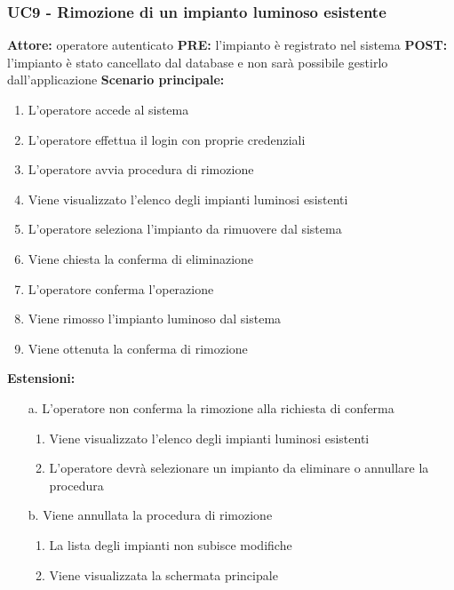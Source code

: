 \documentclass[a4paper, 12pt]{article}
\begin{document}
\subsubsection{UC9 - Rimozione di un impianto luminoso esistente}
\textbf{Attore:} operatore autenticato\newline
\textbf{PRE:} l'impianto è registrato nel sistema\newline
\textbf{POST:} l'impianto è stato cancellato dal database e non sarà possibile gestirlo dall'applicazione\newline
\textbf{Scenario principale:}
\begin{enumerate}
    \item L'operatore accede al sistema
    \item L'operatore effettua il login con proprie credenziali
    \item L'operatore avvia procedura di rimozione
    \item Viene visualizzato l'elenco degli impianti luminosi esistenti
    \item L'operatore seleziona l'impianto da rimuovere dal sistema
    \item Viene chiesta la conferma di eliminazione
    \item L'operatore conferma l'operazione
    \item Viene rimosso l'impianto luminoso dal sistema
    \item Viene ottenuta la conferma di rimozione
\end{enumerate}
\textbf{Estensioni:}
\begin{itemize}
    \item [a.] L'operatore non conferma la rimozione alla richiesta di conferma
    \begin{enumerate}
        \item Viene visualizzato l'elenco degli impianti luminosi esistenti
        \item L'operatore devrà selezionare un impianto da eliminare o annullare la procedura
    \end{enumerate}
    \item [b.] Viene annullata la procedura di rimozione
    \begin{enumerate}
        \item La lista degli impianti non subisce modifiche
        \item Viene visualizzata la schermata principale
    \end{enumerate}
\end{itemize}
\end{document}

